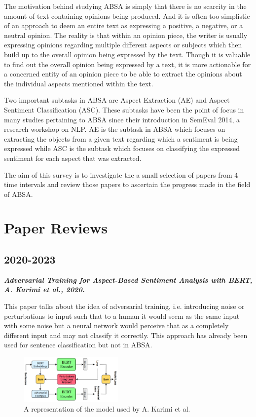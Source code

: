 \documentclass[conference]{IEEEtran}
\begin{document}
The motivation behind studying ABSA is simply that there is no scarcity in the amount of text containing opinions being produced. And it is often too simplistic of an approach to deem an entire text as expressing a positive, a negative, or a neutral opinion. The reality is that within an opinion piece, the writer is usually expressing opinions regarding multiple different aspects or subjects which then build up to the overall opinion being expressed by the text. Though it is valuable to find out the overall opinion being expressed by a text, it is more actionable for a concerned entity of an opinion piece to be able to extract the opinions about the individual aspects mentioned within the text.

Two important subtasks in ABSA are Aspect Extraction (AE) and Aspect Sentiment Classification (ASC). These subtasks have been the point of focus in many studies pertaining to ABSA since their introduction in SemEval 2014, a research workshop on NLP. AE is the subtask in ABSA which focuses on extracting the objects from a given text regarding which a sentiment is being expressed while ASC is the subtask which focuses on classifying the expressed sentiment for each aspect that was extracted.

The aim of this survey is to investigate the a small selection of papers from 4 time intervals and review those papers to ascertain the progress made in the field of ABSA.

\section{Paper Reviews}

\subsection{2020-2023}

\textit{\textbf{Adversarial Training for Aspect-Based Sentiment
Analysis with BERT, A. Karimi et al., 2020.}}

This paper talks about the idea of adversarial training, i.e. introducing noise or perturbations to input such that to a human it would seem as the same input with some noise but a neural network would perceive that as a completely different input and may not classify it correctly. This approach has already been used for sentence classification but not in ABSA.

\begin{figure}[htbp]
\centerline{\includegraphics[keepaspectratio, width=0.45\textwidth]{pics/1.png}}
\caption{A representation of the model used by A. Karimi et al.}
\label{fig}
\end{figure}
\end{document}
